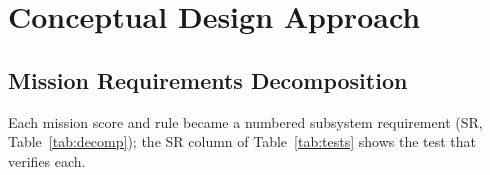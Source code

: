 \section{Conceptual Design Approach}

\subsection{Mission Requirements Decomposition}
Each mission score and rule became a numbered subsystem requirement (SR, Table~\ref{tab:decomp}); the SR column of Table~\ref{tab:tests} shows the test that verifies each.

